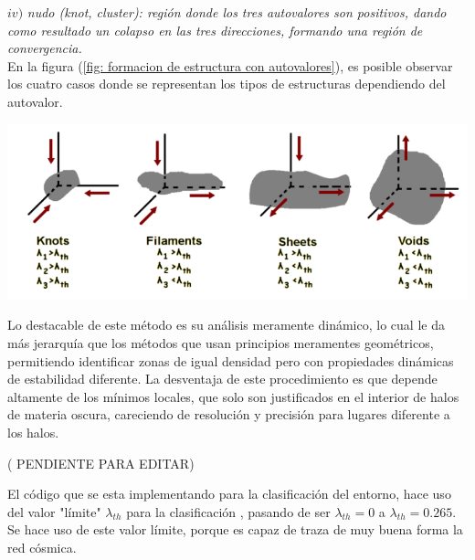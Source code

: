 $iv)$ {\it{nudo (knot, cluster)}: región donde los tres autovalores son positivos, dando como resultado un colapso en las tres direcciones, formando una región de convergencia.}\\

En la figura (\ref{fig: formacion de estructura con autovalores}), es posible observar los cuatro casos donde se representan los tipos de estructuras dependiendo del autovalor.
%
\begin{center}
\includegraphics[scale=.39]{./figures/5_Algoritmo_Modelacion/formacion_estructuras.png}
\label{fig: formacion de estructura con autovalores}
\end{center}
%
Lo destacable de este método es su análisis meramente dinámico, lo cual le da más jerarquía que los métodos que usan principios meramentes geométricos, permitiendo identificar zonas de igual densidad pero con propiedades dinámicas de estabilidad diferente. La desventaja de este procedimiento es que depende altamente de los mínimos locales, que solo son justificados en el interior de halos de materia oscura, careciendo de resolución y precisión para lugares diferente a los halos.

(  PENDIENTE PARA EDITAR)

El código que se esta implementando para la clasificación del entorno, hace uso del valor "límite" $\lambda_{th}$ para la clasificación \cite{bustamante2015}, pasando de ser $\lambda_{th}=0$ a $\lambda_{th}=0.265$. Se hace uso de este valor límite, porque es capaz de traza de muy buena forma la red cósmica. 

